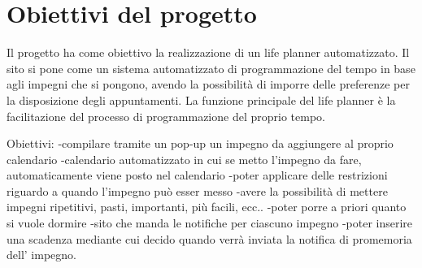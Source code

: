\section{Obiettivi del progetto}
Il progetto ha come obiettivo la realizzazione di un life planner automatizzato.
Il sito si pone come un sistema automatizzato di programmazione del tempo in base agli impegni
che si pongono, avendo la possibilità di imporre delle preferenze per la disposizione degli appuntamenti.
La funzione principale del life planner è la facilitazione del processo di programmazione del proprio tempo.

Obiettivi:
-compilare tramite un pop-up un impegno da aggiungere al proprio calendario
-calendario automatizzato in cui se metto l'impegno da fare, automaticamente viene posto nel calendario
-poter applicare delle restrizioni riguardo a quando l'impegno può esser messo
-avere la possibilità di mettere impegni ripetitivi, pasti, importanti, più facili, ecc..
-poter porre a priori quanto si vuole dormire
-sito che manda le notifiche per ciascuno impegno
-poter inserire una scadenza mediante cui decido quando verrà inviata la notifica di promemoria dell'
impegno.

